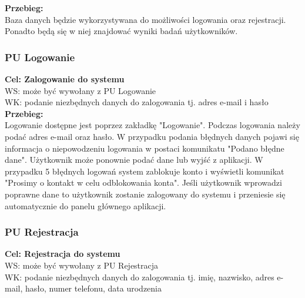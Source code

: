 \documentclass[12pt, letterpaper]{article}
\begin{document}
		\textbf{Przebieg: }\\
		Baza danych będzie wykorzystywana do możliwości logowania oraz rejestracji. Ponadto będą się w niej znajdować wyniki badań użytkowników.
		 \\
		
		
		
		\subsubsection{PU Logowanie}
		
		\quad
		
		\textbf{Cel: Zalogowanie do systemu}\\
		
		WS: może być wywołany z PU Logowanie\\
		
		WK: podanie niezbędnych danych do zalogowania tj. adres e-mail i hasło\\
		
		\textbf{Przebieg:}\\
		Logowanie dostępne jest poprzez zakładkę "Logowanie". Podczas logowania należy podać adres e-mail oraz hasło. W przypadku podania błędnych danych pojawi się informacja o niepowodzeniu logowania w postaci komunikatu "Podano błędne dane". Użytkownik może ponownie podać dane lub wyjść z aplikacji. W przypadku 5 błędnych logowań system zablokuje konto i wyświetli komunikat "Prosimy o kontakt w celu odblokowania konta". Jeśli użytkownik wprowadzi poprawne dane to użytkownik zostanie zalogowany do systemu i przeniesie się automatycznie do panelu głównego aplikacji.\\
		
		
		\subsubsection{PU Rejestracja}
		
		\quad
		
		\textbf{Cel: Rejestracja do systemu}\\
		
		WS: może być wywołany z PU Rejestracja\\
		
		WK: podanie niezbędnych danych do zalogowania tj. imię, nazwisko, adres e-mail, hasło, numer telefonu, data urodzenia\\
		
\end{document}
